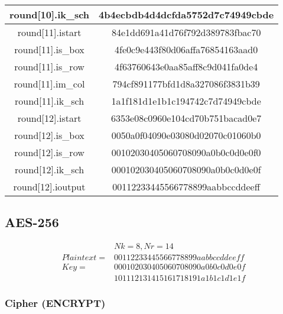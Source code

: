 \begin{center}
\begin{longtable}{|c|c|}
\hline
round[10].ik\_sch&   4b4ecbdb4d4dcfda5752d7c74949cbde\\
\hline
round[11].istart&   84e1dd691a41d76f792d389783fbac70\\
\hline
round[11].is\_box&   4fe0c9e443f80d06affa76854163aad0\\
\hline
round[11].is\_row&   4f63760643e0aa85aff8c9d041fa0de4\\
\hline
round[11].im\_col&   794cf891177bfd1d8a327086f3831b39\\
\hline
round[11].ik\_sch&   1a1f181d1e1b1c194742c7d74949cbde\\
\hline
round[12].istart&   6353e08c0960e104cd70b751bacad0e7\\
\hline
round[12].is\_box&   0050a0f04090e03080d02070c01060b0\\
\hline
round[12].is\_row&   00102030405060708090a0b0c0d0e0f0\\
\hline
round[12].ik\_sch&   000102030405060708090a0b0c0d0e0f\\
\hline
round[12].ioutput&  00112233445566778899aabbccddeeff\\
\hline
\end{longtable}
\end{center}

\newpage
\subsection{AES-256}

\begin{align*}
&Nk=8, Nr=14 \\
Plaintext = &00112233445566778899aabbccddeeff \\
Key = &000102030405060708090a0b0c0d0e0f \\
	  &101112131415161718191a1b1c1d1e1f
\end{align*}


\subsubsection{Cipher (ENCRYPT)}

